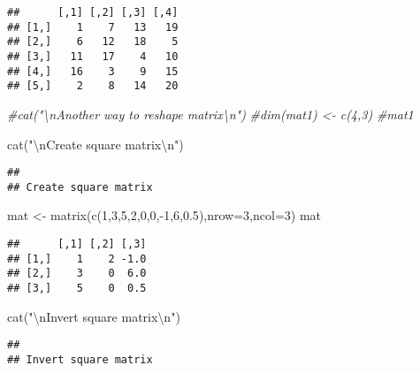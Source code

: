 \documentclass[
]{article}
\newenvironment{Shaded}{\begin{snugshade}}{\end{snugshade}}
\newcommand{\AttributeTok}[1]{\textcolor[rgb]{0.77,0.63,0.00}{#1}}
\newcommand{\CommentTok}[1]{\textcolor[rgb]{0.56,0.35,0.01}{\textit{#1}}}
\newcommand{\DecValTok}[1]{\textcolor[rgb]{0.00,0.00,0.81}{#1}}
\newcommand{\FloatTok}[1]{\textcolor[rgb]{0.00,0.00,0.81}{#1}}
\newcommand{\FunctionTok}[1]{\textcolor[rgb]{0.00,0.00,0.00}{#1}}
\newcommand{\NormalTok}[1]{#1}
\newcommand{\OtherTok}[1]{\textcolor[rgb]{0.56,0.35,0.01}{#1}}
\newcommand{\SpecialCharTok}[1]{\textcolor[rgb]{0.00,0.00,0.00}{#1}}
\newcommand{\StringTok}[1]{\textcolor[rgb]{0.31,0.60,0.02}{#1}}
\begin{document}
\begin{verbatim}
##      [,1] [,2] [,3] [,4]
## [1,]    1    7   13   19
## [2,]    6   12   18    5
## [3,]   11   17    4   10
## [4,]   16    3    9   15
## [5,]    2    8   14   20
\end{verbatim}

\begin{Shaded}
\begin{Highlighting}[]
\CommentTok{\#cat("\textbackslash{}nAnother way to reshape matrix\textbackslash{}n")}
\CommentTok{\#dim(mat1) \textless{}{-} c(4,3)}
\CommentTok{\#mat1}

\FunctionTok{cat}\NormalTok{(}\StringTok{"}\SpecialCharTok{\textbackslash{}n}\StringTok{Create square matrix}\SpecialCharTok{\textbackslash{}n}\StringTok{"}\NormalTok{)}
\end{Highlighting}
\end{Shaded}

\begin{verbatim}
## 
## Create square matrix
\end{verbatim}

\begin{Shaded}
\begin{Highlighting}[]
\NormalTok{mat }\OtherTok{\textless{}{-}} \FunctionTok{matrix}\NormalTok{(}\FunctionTok{c}\NormalTok{(}\DecValTok{1}\NormalTok{,}\DecValTok{3}\NormalTok{,}\DecValTok{5}\NormalTok{,}\DecValTok{2}\NormalTok{,}\DecValTok{0}\NormalTok{,}\DecValTok{0}\NormalTok{,}\SpecialCharTok{{-}}\DecValTok{1}\NormalTok{,}\DecValTok{6}\NormalTok{,}\FloatTok{0.5}\NormalTok{),}\AttributeTok{nrow=}\DecValTok{3}\NormalTok{,}\AttributeTok{ncol=}\DecValTok{3}\NormalTok{)}
\NormalTok{mat}
\end{Highlighting}
\end{Shaded}

\begin{verbatim}
##      [,1] [,2] [,3]
## [1,]    1    2 -1.0
## [2,]    3    0  6.0
## [3,]    5    0  0.5
\end{verbatim}

\begin{Shaded}
\begin{Highlighting}[]
\FunctionTok{cat}\NormalTok{(}\StringTok{"}\SpecialCharTok{\textbackslash{}n}\StringTok{Invert square matrix}\SpecialCharTok{\textbackslash{}n}\StringTok{"}\NormalTok{)}
\end{Highlighting}
\end{Shaded}

\begin{verbatim}
## 
## Invert square matrix
\end{verbatim}
\end{document}

